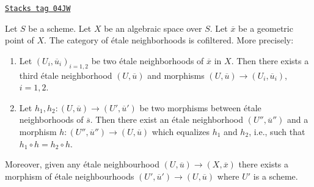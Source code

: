 \begin{lemma}
\label{spaces-properties-lemma-cofinal-etale}
\href{https://stacks.math.columbia.edu/tag/04JW}{\texttt{Stacks tag 04JW}}

Let $S$ be a scheme. Let $X$ be an algebraic space over $S$.
Let $\overline{x}$ be a geometric point of $X$.
The category of \'etale neighborhoods is cofiltered. More precisely:
\begin{enumerate}
\item Let $(U_i, \overline{u}_i)_{i = 1, 2}$ be two \'etale neighborhoods of
$\overline{x}$ in $X$. Then there exists a third \'etale neighborhood
$(U, \overline{u})$ and morphisms
$(U, \overline{u}) \to (U_i, \overline{u}_i)$, $i = 1, 2$.
\item Let $h_1, h_2: (U, \overline{u}) \to (U', \overline{u}')$ be two
morphisms between \'etale neighborhoods of $\overline{s}$. Then there exist an
\'etale neighborhood $(U'', \overline{u}'')$ and a morphism
$h : (U'', \overline{u}'') \to (U, \overline{u})$
which equalizes $h_1$ and $h_2$, i.e., such that
$h_1 \circ h = h_2 \circ h$.
\end{enumerate}
Moreover, given any \'etale neighbourhood
$(U, \overline{u}) \to (X, \overline{x})$
there exists a morphism of \'etale neighbourhoods
$(U', \overline{u}') \to (U, \overline{u})$
where $U'$ is a scheme.
\end{lemma}

